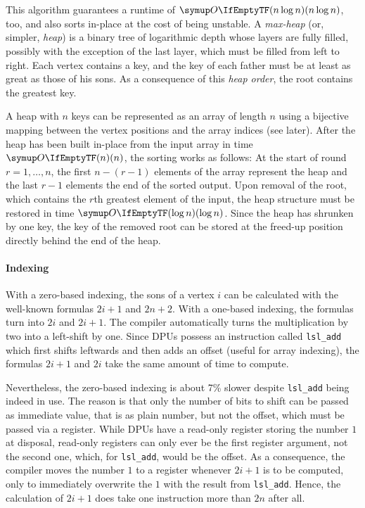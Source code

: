 \section{\texorpdfstring{\HS{}}{HeapSort}}
\label{sec:tasklet:heap}

This algorithm guarantees a runtime of \(\bigoh{n \log n}\), too, and also sorts in-place at the cost of being unstable.
A \emph{max-heap} (or, simpler, \emph{heap}) is a binary tree of logarithmic depth whose layers are fully filled, possibly with the exception of the last layer, which must be filled from left to right.
Each vertex contains a key, and the key of each father must be at least as great as those of his sons.
As a consequence of this \emph{heap order}, the root contains the greatest key.

A heap with \(n\) keys can be represented as an array of length \(n\) using a bijective mapping between the vertex positions and the array indices (see later).
After the heap has been built in-place from the input array in time \(\bigoh{n}\), the sorting works as follows:
At the start of round~\(r = 1, \dots, n\), the first \(n - (r - 1)\) elements of the array represent the heap and the last \(r - 1\) elements the end of the sorted output.
Upon removal of the root, which contains the \(r\)th greatest element of the input, the heap structure must be restored in time \(\bigoh{\log n}\).
Since the heap has shrunken by one key, the key of the removed root can be stored at the freed-up position directly behind the end of the heap.

\paragraph{Indexing}
With a zero-based indexing, the sons of a vertex \(i\) can be calculated with the well-known formulas \(2i + 1\) and \(2n + 2\).
With a one-based indexing, the formulas turn into \(2i\) and \(2i + 1\).
The compiler automatically turns the multiplication by two into a left-shift by one.
Since DPUs possess an instruction called \lstinline|lsl_add| which first shifts leftwards and then adds an offset (useful \eg{} for array indexing), the formulas \(2i + 1\) and \(2i\) take the same amount of time to compute.

Nevertheless, the zero-based indexing is about 7\% slower despite \lstinline|lsl_add| being indeed in use.
The reason is that only the number of bits to shift can be passed as immediate value, that is as plain number, but not the offset, which must be passed via a register.
While DPUs have a read-only register storing the number \(1\) at disposal, read-only registers can only ever be the first register argument, not the second one, which, for \lstinline|lsl_add|, would be the offset.
As a consequence, the compiler moves the number \(1\) to a register whenever \(2i + 1\) is to be computed, only to immediately overwrite the \(1\) with the result from \lstinline|lsl_add|.
Hence, the calculation of \(2i + 1\) does take one instruction more than \(2n\) after all.

